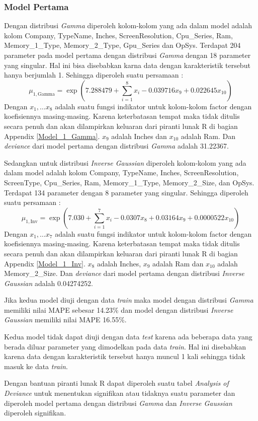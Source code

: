 \documentclass[12pt]{article}
\begin{document}
\subsubsection{Model Pertama} 
Dengan distribusi \textit{Gamma} diperoleh kolom-kolom yang ada dalam model adalah kolom Company, TypeName, Inches, ScreenResolution, Cpu\_Series, Ram, Memory\_1\_Type, Memory\_2\_Type, Gpu\_Series dan OpSys. Terdapat 204 parameter pada model pertama dengan distribusi \textit{Gamma} dengan 18 parameter yang singular. Hal ini bisa disebabkan karna data dengan karakteristik tersebut hanya berjumlah 1. Sehingga diperoleh suatu persamaan :
\begin{equation}
    \label{Gamma_eq}
    \mu_{1,\text{Gamma}} = \exp{\left(7.288479+\sum_{i=1}^8x_i -0.039716x_9+0.022645x_{10}\right)}
\end{equation}  
Dengan $x_1, \dots x_8$ adalah suatu fungsi indikator untuk kolom-kolom factor dengan koefisiennya masing-masing. Karena keterbatasan tempat maka tidak ditulis secara penuh dan akan dilampirkan keluaran dari piranti lunak R di bagian Appendix \ref{Model_1_Gamma}. $x_9$ adalah Inches dan $x_{10}$ adalah Ram. 
Dan \textit{deviance} dari model pertama dengan distribusi \textit{Gamma} adalah 31.22367. 
\par 
Sedangkan untuk distribusi \textit{Inverse Gaussian} diperoleh kolom-kolom yang ada dalam model adalah kolom Company, TypeName, Inches, ScreenResolution, ScreenType, Cpu\_Series, Ram, Memory\_1\_Type, Memory\_2\_Size, dan OpSys. Terdapat 134 parameter dengan 8 parameter yang singular. Sehingga diperoleh suatu persamaan :
\begin{equation}
    \label{Gamma_eq}
    \mu_{1,\text{Inv}} = \exp{\left(7.030+\sum_{i=1}^7x_i-0.0307x_8+0.03164x_9+0.0000522x_{10}\right)}
\end{equation}  
Dengan $x_1, \dots x_7$ adalah suatu fungsi indikator untuk kolom-kolom factor dengan koefisiennya masing-masing. Karena keterbatasan tempat maka tidak ditulis secara penuh dan akan dilampirkan keluaran dari piranti lunak R di bagian Appendix \ref{Model_1_Inv}. $x_8$ adalah Inches, $x_9$ adalah Ram dan $x_{10}$ adalah Memory\_2\_Size. 
Dan \textit{deviance} dari model pertama dengan distribusi \textit{Inverse Gaussian} adalah 0.04274252. 
\par
Jika kedua model diuji dengan data \textit{train} maka model dengan distribusi \textit{Gamma} memiliki nilai MAPE sebesar 14.23\% dan model dengan distribusi \textit{Inverse Gaussian} memiliki nilai MAPE 16.55\%.  
\par 
Kedua model tidak dapat diuji dengan data \textit{test} karena ada beberapa data yang berada diluar parameter yang dimodelkan pada data \textit{train}. Hal ini disebabkan karena data dengan karakteristik tersebut hanya muncul 1 kali sehingga tidak masuk ke data \textit{train}.  
\par 
Dengan bantuan piranti lunak R dapat diperoleh suatu tabel \textit{Analysis of Deviance} untuk menentukan signifikan atau tidaknya suatu parameter dan diperoleh model pertama dengan distribusi \textit{Gamma} dan \textit{Inverse Gaussian}  diperoleh signifikan.
\end{document}
